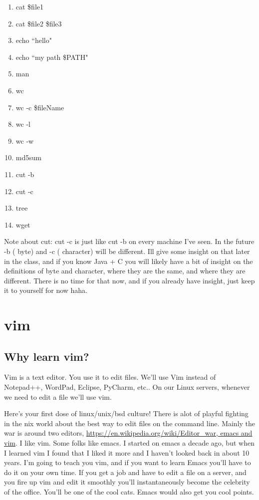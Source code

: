 \documentclass[10pt]{article}
\begin{document}
\begin{multicols}{4}
\begin{enumerate}
\item cat \$file1
\item cat \$file2 \$file3
\item echo ``hello"
\item echo ``my path \$PATH"
\item man
\item wc
\item wc -c \$fileName
\item wc -l
\item wc -w
\item md5sum
\item cut -b
\item cut -c 
\item tree
\item wget
\end{enumerate}
\end{multicols}

Note about cut: cut -c is just like cut -b on every machine I've seen. In the future -b ( byte) and -c ( character) will be different. Ill give some insight on that later in the class, and if you know Java + C you will likely have a bit of insight on the definitions of byte and character, where they are the same, and where they are different. There is no time for that now, and if you already have insight, just keep it to yourself for now haha.

\section*{vim}
\subsection{Why learn vim?}

Vim is a text editor. You use it to edit files. We'll use Vim instead of
Notepad++, WordPad, Eclipse, PyCharm, etc.. On our Linux servers, whenever we
need to edit a file we'll use vim.

Here's your first dose of linux/unix/bsd
culture! There is alot of playful fighting in the \*nix world about the best way
to edit files on the command line. Mainly the war is around two editors,
\url{https://en.wikipedia.org/wiki/Editor_war, emacs and vim}. I like vim. Some folks like emacs.
I started on emacs a decade ago, but when I learned vim I found that I liked it more and I haven't looked back in about 10 years. I'm going to teach you vim, and if you want to learn Emacs you'll have to do it on your own time. 
If you get a job and have to edit a file on a server, and you fire up vim and edit it smoothly you'll instantaneously become the celebrity of the office. You'll be one of the cool cats. Emacs would also get you cool points.
\end{document}
